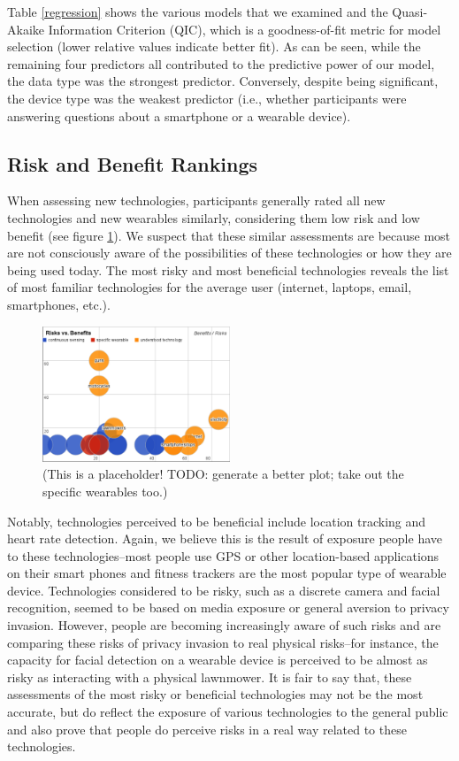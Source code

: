 \documentclass{acm_proc_article-sp}
\begin{document}
Table \ref{regression} shows the various models that we examined and the Quasi-Akaike Information Criterion (QIC), which is a goodness-of-fit metric for model selection (lower relative values indicate better fit). As can be seen, while the remaining four predictors all contributed to the predictive power of our model, the data type was the strongest predictor. Conversely, despite being significant, the device type was the weakest predictor (i.e., whether participants were answering questions about a smartphone or a wearable device).


\subsection{Risk and Benefit Rankings} 
When assessing new technologies, participants generally rated all new technologies and new wearables similarly, considering them low risk and low benefit (see figure \ref{fig:techplot}). We suspect that these similar assessments are because most are not consciously aware of the possibilities of these technologies or how they are being used today. The most risky and most beneficial technologies reveals the list of most familiar technologies for the average user (internet, laptops, email, smartphones, etc.). 


\begin{figure}
	\centering
	\includegraphics[width=0.5\textwidth]{techplot.png}
	\caption{(This is a placeholder! TODO: generate a better plot; take out the specific wearables too.)}
	\label{fig:techplot}
\end{figure}

Notably, technologies perceived to be beneficial include location tracking and heart rate detection. Again, we believe this is the result of exposure people have to these technologies--most people use GPS or other location-based applications on their smart phones and fitness trackers are the most popular type of wearable device. Technologies considered to be risky, such as a discrete camera and facial recognition, seemed to be based on media exposure or general aversion to privacy invasion. However, people are becoming increasingly aware of such risks and are comparing these risks of privacy invasion to real physical risks--for instance, the capacity for facial detection on a wearable device is perceived to be almost as risky as interacting with a physical lawnmower. It is fair to say that, these assessments of the most risky or beneficial technologies may not be the most accurate, but do reflect the exposure of various technologies to the general public and also prove that people do perceive risks in a real way related to these technologies. 
\end{document}
